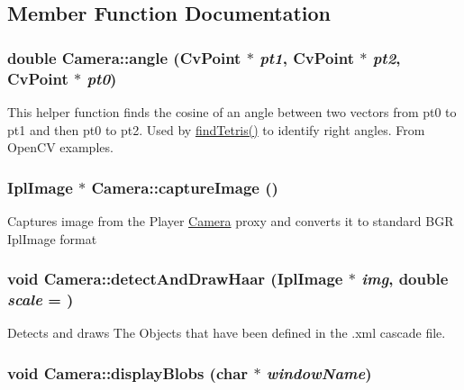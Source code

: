 \subsection{Member Function Documentation}
\hypertarget{classCamera_a5d6b9a8b9772301c7fd6be163bea0187}{
\subsubsection[{angle}]{\setlength{\rightskip}{0pt plus 5cm}double Camera::angle (CvPoint $\ast$ {\em pt1}, \/  CvPoint $\ast$ {\em pt2}, \/  CvPoint $\ast$ {\em pt0})}}
\label{classCamera_a5d6b9a8b9772301c7fd6be163bea0187}
This helper function finds the cosine of an angle between two vectors from pt0 to pt1 and then pt0 to pt2. Used by \hyperlink{classCamera_a21b8d96617b3fede0373a7af8f998bb6}{findTetris()} to identify right angles. From OpenCV examples. \hypertarget{classCamera_a02d5576415e72e46c717f6b1221fa4a4}{
\subsubsection[{captureImage}]{\setlength{\rightskip}{0pt plus 5cm}IplImage $\ast$ Camera::captureImage ()}}
\label{classCamera_a02d5576415e72e46c717f6b1221fa4a4}
Captures image from the Player \hyperlink{classCamera}{Camera} proxy and converts it to standard BGR IplImage format \hypertarget{classCamera_a463b40c912469d22df3ca81bb85bbf60}{
\subsubsection[{detectAndDrawHaar}]{\setlength{\rightskip}{0pt plus 5cm}void Camera::detectAndDrawHaar (IplImage $\ast$ {\em img}, \/  double {\em scale} = {})}}
\label{classCamera_a463b40c912469d22df3ca81bb85bbf60}
Detects and draws The Objects that have been defined in the .xml cascade file. \hypertarget{classCamera_af4d89ca5c815928bdf8cf1cf8cb0f058}{
\subsubsection[{displayBlobs}]{\setlength{\rightskip}{0pt plus 5cm}void Camera::displayBlobs (char $\ast$ {\em windowName})}}

